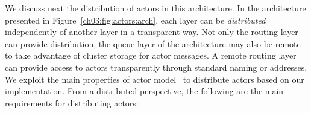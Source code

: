 We discuss next the distribution of actors in this architecture.
In the architecture presented  in Figure~\ref{ch03:fig:actors:arch}, each layer can be \emph{distributed} independently of another layer in a transparent way.
Not only the routing layer can provide distribution, the queue layer of the architecture may also be remote to take advantage of cluster storage for actor messages. 
A remote routing layer can provide access to actors transparently through standard naming or addresses.
We exploit the main properties of actor model~\cite{agha97,Agha90} to distribute actors based on our implementation.
From a distributed perspective, the following are the main requirements for  distributing actors:
